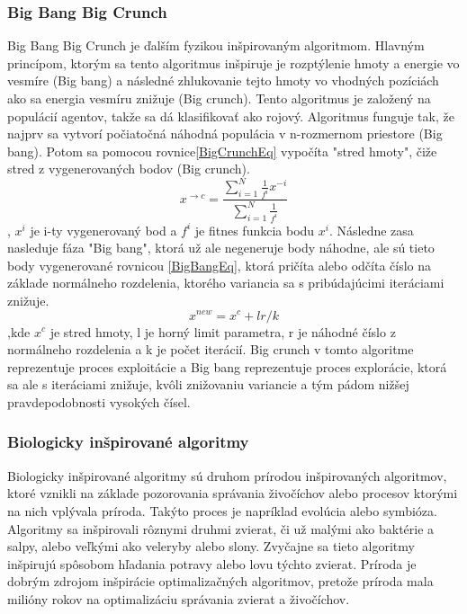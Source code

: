 \subsubsection*{Big Bang Big Crunch}
Big Bang Big Crunch je ďalším fyzikou inšpirovaným algoritmom. Hlavným princípom, ktorým sa tento algoritmus inšpiruje je rozptýlenie hmoty a energie vo vesmíre (Big bang) a následné zhlukovanie tejto hmoty vo vhodných pozíciách ako sa energia vesmíru znižuje (Big crunch). Tento algoritmus je založený na populácií agentov, takže sa dá klasifikovať ako rojový.
Algoritmus funguje tak, že najprv sa vytvorí počiatočná náhodná populácia v n-rozmernom priestore (Big bang). Potom sa pomocou rovnice\ref{BigCrunchEq} vypočíta "stred hmoty", čiže stred z vygenerovaných bodov (Big crunch). 
\begin{equation}\label{BigCrunchEq}
   x^{\xrightarrow{}c} = \frac{\sum_{i=1}^{N}\frac{1}{f^i}x^{-i}}{\sum_{i=1}^{N}\frac{1}{f^i}}
\end{equation}
,  \(x^{i}\) je i-ty vygenerovaný bod a \(f^i\) je fitnes funkcia bodu \(x^i\).\newline
Následne zasa nasleduje fáza "Big bang", ktorá už ale negeneruje body náhodne, ale sú tieto body vygenerované rovnicou \ref{BigBangEq}, ktorá pričíta alebo odčíta číslo na základe normálneho rozdelenia, ktorého variancia sa s pribúdajúcimi iteráciami znižuje.
\begin{equation}\label{BigBangEq}
x^{new} = x^{c} + lr/k
\end{equation}
,kde \(x^c\) je stred hmoty, l je horný limit parametra, r je náhodné číslo z normálneho rozdelenia a k je počet iterácií.
Big crunch v tomto algoritme reprezentuje proces exploitácie a Big bang reprezentuje proces explorácie, ktorá sa ale s iteráciami znižuje, kvôli znižovaniu variancie a tým pádom nižšej pravdepodobnosti vysokých čísel. 
\subsubsection{Biologicky inšpirované algoritmy}\label{bio_algo}
 Biologicky inšpirované algoritmy sú druhom prírodou inšpirovaných algoritmov, ktoré vznikli na základe pozorovania správania živočíchov alebo procesov ktorými na nich vplývala príroda. Takýto proces je napríklad evolúcia alebo symbióza. Algoritmy sa inšpirovali rôznymi druhmi zvierat, či už malými ako baktérie a salpy, alebo veľkými ako veleryby alebo slony. Zvyčajne sa tieto algoritmy inšpirujú spôsobom hľadania potravy alebo lovu týchto zvierat. Príroda je dobrým zdrojom inšpirácie optimalizačných algoritmov, pretože príroda mala milióny rokov na optimalizáciu správania zvierat a živočíchov. 
